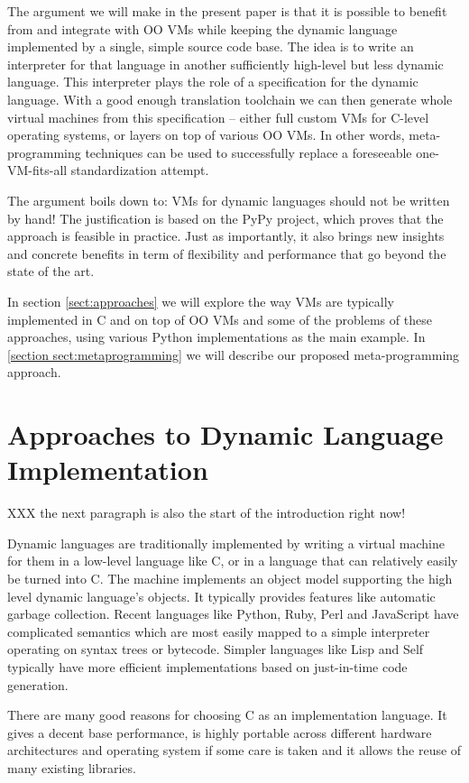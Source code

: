 \documentclass{llncs}
\begin{document}
The argument we will make in the present paper is that it is possible to
benefit from and integrate with OO VMs while keeping the dynamic
language implemented by a single, simple source code base.  The idea is
to write an interpreter for that language in another sufficiently
high-level but less dynamic language.  This interpreter plays the role
of a specification for the dynamic language.  With a good enough
translation toolchain we can then generate whole virtual machines from
this specification – either full custom VMs for C-level operating
systems, or layers on top of various OO VMs.  In other words,
meta-programming techniques can be used to successfully replace a
foreseeable one-VM-fits-all standardization attempt.

The argument boils down to: VMs for dynamic languages should not be
written by hand!  The justification is based on the
PyPy project, which proves that the approach is
feasible in practice.  Just as importantly, it also brings new insights
and concrete benefits in term of flexibility and performance that go
beyond the state of the art.

In section \ref{sect:approaches} we will explore the way VMs are typically
implemented in C and on top of OO VMs and some of the problems of these
approaches, using various Python implementations as the main example. In
\ref{section sect:metaprogramming} we will describe our proposed
meta-programming approach.


\section{Approaches to Dynamic Language Implementation}
\label{sect:appraches}

XXX the next paragraph is also the start of the introduction right now!

Dynamic languages are traditionally implemented by writing a virtual
machine for them in a low-level language like C, or in a language that
can relatively easily be turned into C.  The machine implements an
object model supporting the high level dynamic language's objects.  It
typically provides features like automatic garbage collection.  Recent
languages like Python, Ruby, Perl and JavaScript have complicated
semantics which are most easily mapped to a simple interpreter operating
on syntax trees or bytecode. Simpler languages like Lisp and Self
typically have more efficient implementations based on just-in-time code
generation.

There are many good reasons for choosing C as an implementation language. It
gives a decent base performance, is highly portable across different hardware
architectures and operating system if some care is taken and it allows the reuse
of many existing libraries.
\end{document}
